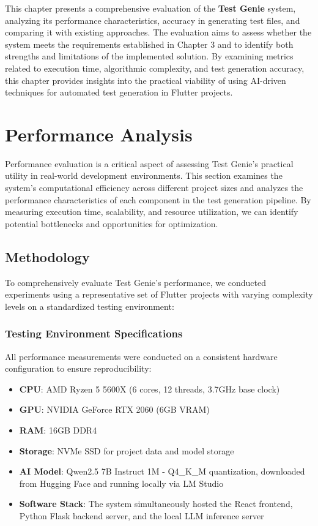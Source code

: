 This chapter presents a comprehensive evaluation of the \textbf{Test Genie} system, analyzing its performance characteristics, accuracy in generating test files, and comparing it with existing approaches. The evaluation aims to assess whether the system meets the requirements established in Chapter 3 and to identify both strengths and limitations of the implemented solution. By examining metrics related to execution time, algorithmic complexity, and test generation accuracy, this chapter provides insights into the practical viability of using AI-driven techniques for automated test generation in Flutter projects.

\section{Performance Analysis}

Performance evaluation is a critical aspect of assessing Test Genie's practical utility in real-world development environments. This section examines the system's computational efficiency across different project sizes and analyzes the performance characteristics of each component in the test generation pipeline. By measuring execution time, scalability, and resource utilization, we can identify potential bottlenecks and opportunities for optimization.

\subsection{Methodology}

To comprehensively evaluate Test Genie's performance, we conducted experiments using a representative set of Flutter projects with varying complexity levels on a standardized testing environment:

\subsubsection{Testing Environment Specifications}

All performance measurements were conducted on a consistent hardware configuration to ensure reproducibility:

\begin{itemize}
    \item \textbf{CPU}: AMD Ryzen 5 5600X (6 cores, 12 threads, 3.7GHz base clock)
    \item \textbf{GPU}: NVIDIA GeForce RTX 2060 (6GB VRAM)
    \item \textbf{RAM}: 16GB DDR4
    \item \textbf{Storage}: NVMe SSD for project data and model storage
    \item \textbf{AI Model}: Qwen2.5 7B Instruct 1M - Q4\_K\_M quantization, downloaded from Hugging Face and running locally via LM Studio
    \item \textbf{Software Stack}: The system simultaneously hosted the React frontend, Python Flask backend server, and the local LLM inference server
\end{itemize}

